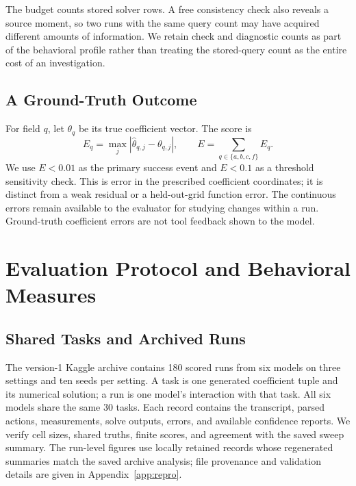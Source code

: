 \documentclass{article}
\begin{document}
The budget counts stored solver rows. A free consistency check also reveals a
source moment, so two runs with the same query count may have acquired different
amounts of information. We retain check and diagnostic counts as part of the
behavioral profile rather than treating the stored-query count as the entire
cost of an investigation.

\subsection{A Ground-Truth Outcome}

For field \(q\), let \(\theta_q\) be its true coefficient vector. The score is
\begin{equation}
 E_q=\max_j|\widehat\theta_{q,j}-\theta_{q,j}|,\qquad
 E=\sum_{q\in\{a,b,c,f\}}E_q.
 \label{eq:error}
\end{equation}
We use \(E<0.01\) as the primary success event and \(E<0.1\) as a threshold
sensitivity check. This is error in the prescribed coefficient coordinates;
it is distinct from a weak residual or a held-out-grid function error. The
continuous errors remain available to the evaluator for studying changes within
a run. Ground-truth coefficient errors are not tool feedback shown to the model.

\section{Evaluation Protocol and Behavioral Measures}
\label{sec:methods}
\label{sec:profile}

\subsection{Shared Tasks and Archived Runs}

The version-1 Kaggle archive contains 180 scored runs from six models on three
settings and ten seeds per setting. A task is one generated coefficient tuple
and its numerical solution; a run is one model's interaction with that task.
All six models share the same 30 tasks. Each record contains the transcript,
parsed actions, measurements, solve outputs, errors, and available confidence
reports. We verify cell sizes, shared truths, finite scores, and agreement with
the saved sweep summary. The run-level figures use locally retained records
whose regenerated summaries match the saved archive analysis; file provenance
and validation details are given in Appendix~\ref{app:repro}.
\end{document}
